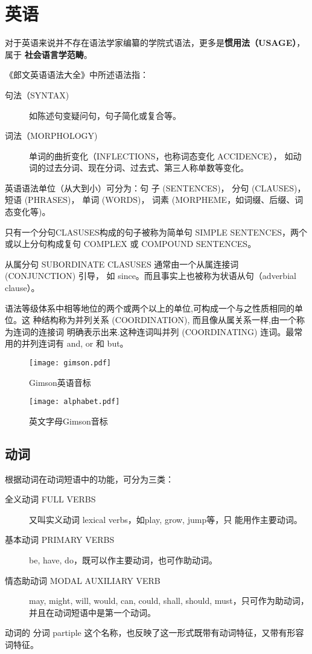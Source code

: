 \chapter{英语}

对于英语来说并不存在语法学家编纂的学院式语法，更多是\textbf{惯用法（USAGE）}，属于
\textbf{社会语言学范畴}。

《郎文英语语法大全》中所述语法指：
\begin{description}
\item [句法（SYNTAX)] 如陈述句变疑问句，句子简化或复合等。
\item [词法（MORPHOLOGY)] 单词的曲折变化（INFLECTIONS，也称词态变化 ACCIDENCE），
  如动词的过去分词、现在分词、过去式、第三人称单数等变化。
\end{description}

英语语法单位（从大到小）可分为：句
子 (SENTENCES)， 分句 (CLAUSES)， 短语 (PHRASES)， 单词 (WORDS)， 词素
(MORPHEME，如词缀、后缀、词态变化等)。

只有一个分句CLASUSES构成的句子被称为简单句 SIMPLE SENTENCES，两个或以上分句构成复句
COMPLEX 或 COMPOUND SENTENCES。

从属分句 SUBORDINATE CLASUSES 通常由一个从属连接词 (CONJUNCTION) 引导，
如 since。而且事实上也被称为状语从句（adverbial clause）。

语法等级体系中相等地位的两个或两个以上的单位,可构成一个与之性质相同的单位。这
种结构称为并列关系 (COORDINATION), 而且像从属关系一样,由一个称为连词的连接词
明确表示出来.这种连词叫并列 (COORDINATING) 连词。最常用的并列连词有 and, or
和 but。



\begin{figure}[htbp!]
  \centering
  \texttt{[image: gimson.pdf]}
  \caption{\label{fig:gimson}Gimson英语音标}

  \bigskip

  \texttt{[image: alphabet.pdf]}
  \caption{\label{fig:alphabet}英文字母Gimson音标}

\end{figure}

\section{动词}

根据动词在动词短语中的功能，可分为三类：
\begin{description}
\item[全义动词 FULL VERBS] 又叫实义动词 lexical verbs，如play, grow, jump等，只
  能用作主要动词。
\item[基本动词 PRIMARY VERBS] be, have, do，既可以作主要动词，也可作助动词。
\item[情态助动词 MODAL AUXILIARY VERB] may, might, will, would, can, could,
  shall, should, must，只可作为助动词，并且在动词短语中是第一个动词。


\end{description}


动词的 分词 partiple 这个名称，也反映了这一形式既带有动词特征，又带有形容词特征。


